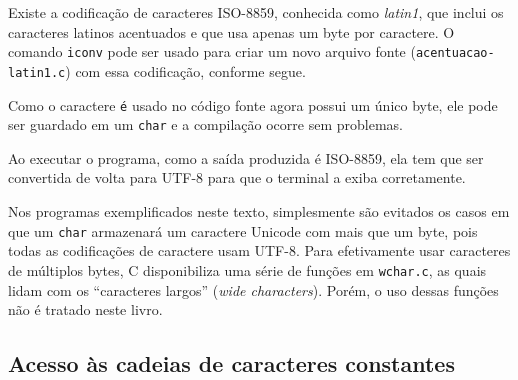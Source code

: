 \documentclass[
  letterpaper,
  DIV=11,
  numbers=noendperiod]{scrartcl}
\newenvironment{Shaded}{\begin{snugshade}}{\end{snugshade}}
\newcommand{\NormalTok}[1]{\textcolor[rgb]{0.00,0.23,0.31}{#1}}
\begin{document}
Existe a codificação de caracteres ISO-8859, conhecida como
\emph{latin1}, que inclui os caracteres latinos acentuados e que usa
apenas um byte por caractere. O comando \texttt{iconv} pode ser usado
para criar um novo arquivo fonte (\texttt{acentuacao-latin1.c}) com essa
codificação, conforme segue.

\begin{Shaded}
\end{Shaded}

Como o caractere \texttt{é} usado no código fonte agora possui um único
byte, ele pode ser guardado em um \texttt{char} e a compilação ocorre
sem problemas.

\begin{Shaded}
\end{Shaded}

Ao executar o programa, como a saída produzida é ISO-8859, ela tem que
ser convertida de volta para UTF-8 para que o terminal a exiba
corretamente.

\begin{Shaded}
\end{Shaded}

Nos programas exemplificados neste texto, simplesmente são evitados os
casos em que um \texttt{char} armazenará um caractere Unicode com mais
que um byte, pois todas as codificações de caractere usam UTF-8. Para
efetivamente usar caracteres de múltiplos bytes, C disponibiliza uma
série de funções em \texttt{wchar.c}, as quais lidam com os ``caracteres
largos'' (\emph{wide characters}). Porém, o uso dessas funções não é
tratado neste livro.

\subsection{Acesso às cadeias de caracteres
constantes}\label{sec-ponteiros-para-strings-constantes}
\end{document}
